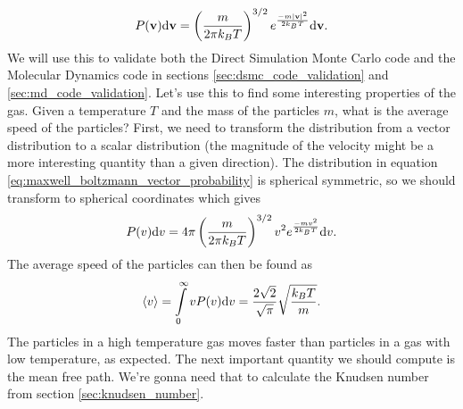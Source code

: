 \begin{align}
	\label{eq:maxwell_boltzmann_vector_probability}
	P(\mathbf v)\mathrm{d}\mathbf v = \left(\frac{m}{2\pi k_B T}\right)^{3/2}e^\frac{-m|\mathbf v|^2}{2k_BT} \mathrm{d}\mathbf v.
\end{align}
We will use this to validate both the Direct Simulation Monte Carlo code and the Molecular Dynamics code in sections \ref{sec:dsmc_code_validation} and \ref{sec:md_code_validation}. Let's use this to find some interesting properties of the gas. Given a temperature $T$ and the mass of the particles $m$, what is the average speed of the particles? First, we need to transform the distribution from a vector distribution to a scalar distribution (the magnitude of the velocity might be a more interesting quantity than a given direction). The distribution in equation \eqref{eq:maxwell_boltzmann_vector_probability} is spherical symmetric, so we should transform to spherical coordinates which gives
\begin{align}
	\label{eq:maxwell_boltzmann_scalar_probability}
	P(v)\mathrm{d}v = 4\pi\left(\frac{m}{2\pi k_B T}\right)^{3/2}v^2e^\frac{-mv^2}{2k_BT} \mathrm{d}v.
\end{align}
The average speed of the particles can then be found as
\begin{align}
	\label{eq:maxwell_boltzmann_average_speed}
	\langle v\rangle = \int\limits_0^\infty vP(v) \mathrm{d}v = \frac{2\sqrt 2}{\sqrt \pi}\sqrt\frac{k_B T}{m}.
\end{align}
The particles in a high temperature gas moves faster than particles in a gas with low temperature, as expected. The next important quantity we should compute is the mean free path. We're gonna need that to calculate the Knudsen number from section \ref{sec:knudsen_number}.